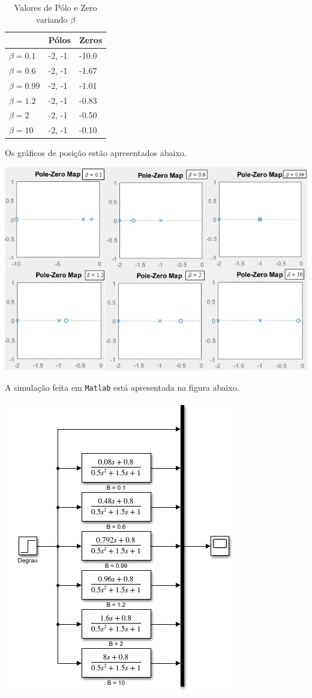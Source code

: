 \documentclass[
]{book}
\begin{document}
\begin{table}

\caption{\label{tab:unnamed-chunk-6}Valores de Pólo e Zero variando $\beta$}
\centering
\begin{tabular}[t]{lll}
\toprule
  & Pólos & Zeros\\
\midrule
$\beta = 0.1$ & {-2, -1} & -10.0\\
$\beta = 0.6$ & {-2, -1} & -1.67\\
$\beta = 0.99$ & {-2, -1} & -1.01\\
$\beta = 1.2$ & {-2, -1} & -0.83\\
$\beta = 2$ & {-2, -1} & -0.50\\
\addlinespace
$\beta = 10$ & {-2, -1} & -0.10\\
\bottomrule
\end{tabular}
\end{table}

Os gráficos de posição estão apresentados abaixo.

\includegraphics{Imagens/Lab2/prob4Varios.jpg}

A simulação feita em \texttt{Matlab} está apresentada na figura abaixo.

\includegraphics{Imagens/Lab2/modelSim4.jpg}
\end{document}

